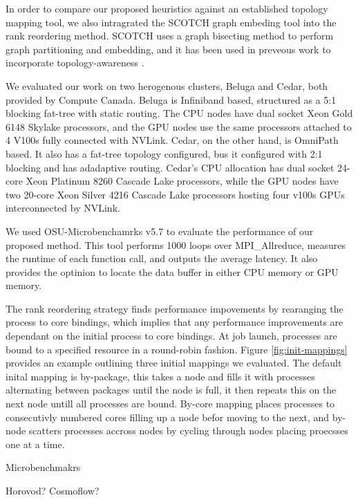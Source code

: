 In order to compare our proposed heuristics against an established topology mapping tool, we also intragrated the SCOTCH graph embeding tool \cite{Pellegrini2012SCOTCH} into the rank reordering method.
SCOTCH uses a graph bisecting method to perform graph partitioning and embedding, and it has been used in preveous work to incorporate topology-awareness \cite{Mirsadeghi2016TopoAwareCollRR}.

We evaluated our work on two herogenous clusters, Beluga and Cedar, both provided by Compute Canada. 
Beluga is Infiniband based, structured as a 5:1 blocking fat-tree with static routing.  
The CPU nodes have dual socket Xeon Gold 6148 Skylake processors, and the GPU nodes use the same processors attached to 4 V100s fully connected with NVLink.
Cedar, on the other hand, is OmniPath based.
It also has a fat-tree topology configured, bus it configured with 2:1 blocking and has adadaptive routing.
Cedar's CPU allocation has dual socket 24-core Xeon Platinum 8260 Cascade Lake processors, while the GPU nodes have two 20-core Xeon Silver 4216 Cascade Lake processors hosting four v100s GPUs interconnected by NVLink.

We used OSU-Microbenchamrks v5.7 \cite{Bureddy2012OMB} to evaluate the performance of our proposed method. 
This tool performs 1000 loops over MPI\_Allreduce, measures the runtime of each function call, and outputs the average latency. 
It also provides the optinion to locate the data buffer in either CPU memory or GPU memory.


The rank reordering strategy finds performance impovements by rearanging the process to core bindings, which implies that any performance improvements are dependant on the initial process to core bindings.
At job launch, processes are bound to a specified resource in a round-robin fashion.
Figure \ref{fig:init-mappings} provides an example outlining three initial mappings we evaluated.
The default inital mapping is by-package, this takes a node and fills it with processes alternating between packages until the node is full, it then repeats this on the next node untill all processes are bound.
By-core mapping places processes to consecutivly numbered cores filling up a node befor moving to the next, and by-node scatters processes accross nodes by cycling through nodes placing proecsses one at a time.

% 

% 

% 

Microbenchmakrs

Horovod? Cosmoflow?